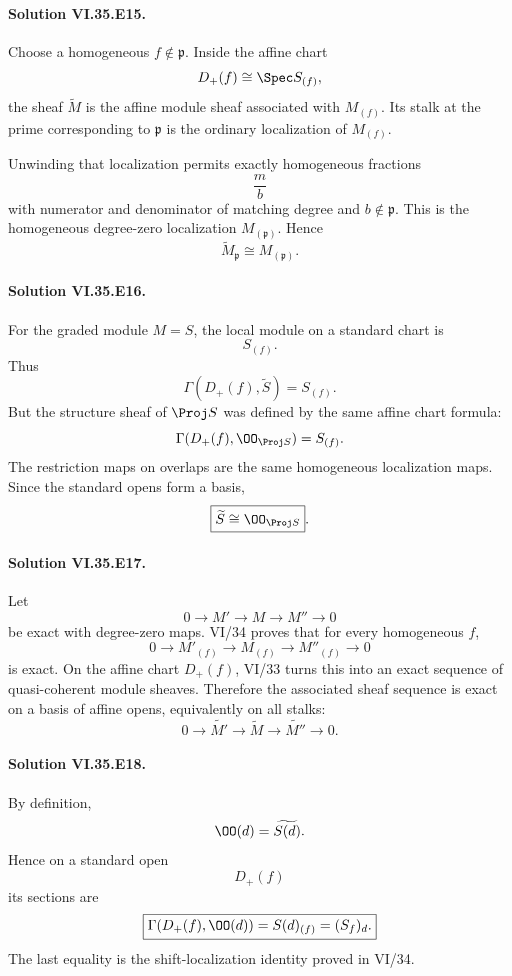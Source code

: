 \paragraph{Solution VI.35.E15.}
Choose a homogeneous \(f\notin\mathfrak p\). Inside the affine chart
\[
D_+(f)\cong\Spec S_{(f)},
\]
the sheaf \(\widetilde M\) is the affine module sheaf associated with \(M_{(f)}\). Its stalk at the prime
corresponding to \(\mathfrak p\) is the ordinary localization of \(M_{(f)}\).

Unwinding that localization permits exactly homogeneous fractions
\[
\frac mb
\]
with numerator and denominator of matching degree and \(b\notin\mathfrak p\). This is the homogeneous
degree-zero localization \(M_{(\mathfrak p)}\). Hence
\[
\boxed{\widetilde M_{\mathfrak p}\cong M_{(\mathfrak p)}}.
\]

\paragraph{Solution VI.35.E16.}
For the graded module \(M=S\), the local module on a standard chart is
\[
S_{(f)}.
\]
Thus
\[
\Gamma(D_+(f),\widetilde S)=S_{(f)}.
\]
But the structure sheaf of \(\Proj S\) was defined by the same affine chart formula:
\[
\Gamma(D_+(f),\OO_{\Proj S})=S_{(f)}.
\]
The restriction maps on overlaps are the same homogeneous localization maps. Since the standard opens form a
basis,
\[
\boxed{\widetilde S\cong\OO_{\Proj S}}.
\]

\paragraph{Solution VI.35.E17.}
Let
\[
0\to M'\to M\to M''\to0
\]
be exact with degree-zero maps. VI/34 proves that for every homogeneous \(f\),
\[
0\to M'_{(f)}\to M_{(f)}\to M''_{(f)}\to0
\]
is exact. On the affine chart \(D_+(f)\), VI/33 turns this into an exact sequence of quasi-coherent module sheaves.
Therefore the associated sheaf sequence is exact on a basis of affine opens, equivalently on all stalks:
\[
\boxed{
0\to\widetilde{M'}\to\widetilde M\to\widetilde{M''}\to0.
}
\]

\paragraph{Solution VI.35.E18.}
By definition,
\[
\OO(d)=\widetilde{S(d)}.
\]
Hence on a standard open
\[
D_+(f)
\]
its sections are
\[
\boxed{
\Gamma(D_+(f),\OO(d))
=
S(d)_{(f)}
=
(S_f)_d.
}
\]
The last equality is the shift-localization identity proved in VI/34.

